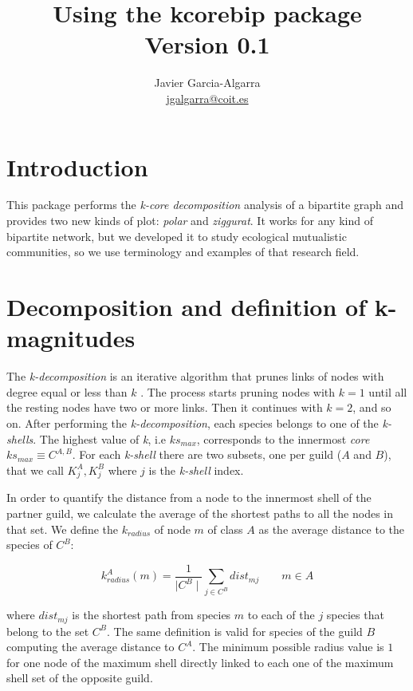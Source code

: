 \documentclass[12pt]{article}
\title{Using the kcorebip package \\ \small{Version 0.1}}
\author{Javier Garcia-Algarra \\ \href{mailto:jgalgarra@coit.es}{jgalgarra@coit.es} }
\begin{document}
\flushbottom
\maketitle
\thispagestyle{empty}

\section*{Introduction}

This package performs the \textit{k-core decomposition} analysis of a bipartite graph and provides two new kinds of plot: \textit{polar} and \textit{ziggurat}. It works for
any kind of bipartite network, but we developed it to study ecological mutualistic communities, so we use terminology and examples of that research field.

\section*{Decomposition and definition of k-magnitudes}
\label{K-magnitudes}

The \textit{k-decomposition} is an iterative algorithm that prunes links of nodes with degree equal or less than $k$ \cite{seidman1983network}. The process starts pruning nodes with $k=1$ until all the resting nodes have two or more links. Then it continues with $k=2$, and so on. After performing the \textit{k-decomposition}, each species belongs to one of the \textit{k-shells}. The highest value of \textit{k}, i.e $ks_{max}$, corresponds to the innermost \textit{core} $ks_{max}\equiv C^{A,B}$. For each \textit{k-shell} there are two subsets, one per guild ($A$ and $B$), that we call $K^{A}_{j}, K^{B}_{j}$ where $j$ is the \textit{k-shell} index.

In order to quantify the distance from a node to the innermost shell of the partner guild, we calculate the average of the shortest paths to all the nodes in that set. We define the \textit{$k_{radius}$} of node $m$ of class $A$ as the average distance to the species of $C^B$:

\begin{equation}
\displaystyle
k^A_{radius}(m) = \frac{1}{\mid C^{B} \mid}\sum\limits_{j \in C^{B}} dist_{mj}  \qquad   m \in A
\label{kradius}
\end{equation}

\noindent where $dist_{mj}$ is the shortest path from species $m$ to each of the $j$ species that belong to the set $C^B$. The same definition is valid for species of the guild $B$ computing the average distance to $C^A$. The minimum possible radius value is $1$ for one node of the maximum shell directly linked to each one of the maximum shell set of the opposite guild.
\end{document}
